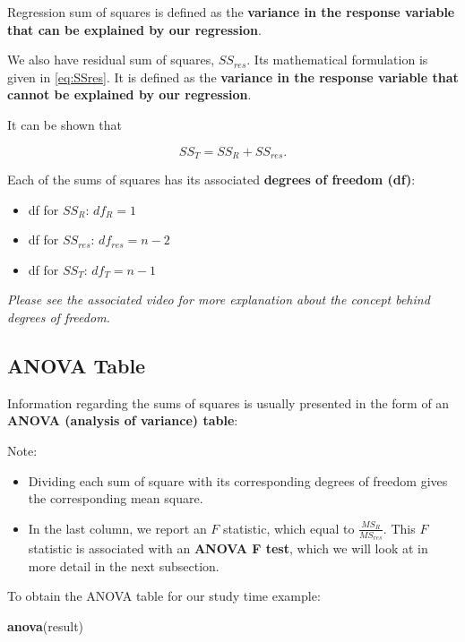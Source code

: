 \documentclass[
]{book}
\newenvironment{Shaded}{\begin{snugshade}}{\end{snugshade}}
\newcommand{\FunctionTok}[1]{\textcolor[rgb]{0.13,0.29,0.53}{\textbf{#1}}}
\newcommand{\NormalTok}[1]{#1}
\providecommand{\tightlist}{%
  \setlength{\itemsep}{0pt}\setlength{\parskip}{0pt}}
\begin{document}
Regression sum of squares is defined as the \textbf{variance in the response variable that can be explained by our regression}.

We also have residual sum of squares, \(SS_{res}\). Its mathematical formulation is given in \eqref{eq:SSres}. It is defined as the \textbf{variance in the response variable that cannot be explained by our regression}.

It can be shown that

\begin{equation}
SS_T = SS_R + SS_{res}.
\label{eq:SS}
\end{equation}

Each of the sums of squares has its associated \textbf{degrees of freedom (df)}:

\begin{itemize}
\tightlist
\item
  df for \(SS_R\): \(df_R = 1\)
\item
  df for \(SS_{res}\): \(df_{res} = n-2\)
\item
  df for \(SS_T\): \(df_T = n-1\)
\end{itemize}

\emph{Please see the associated video for more explanation about the concept behind degrees of freedom.}

\hypertarget{anova-table}{%
\subsection{ANOVA Table}\label{anova-table}}

Information regarding the sums of squares is usually presented in the form of an \textbf{ANOVA (analysis of variance) table}:

Note:

\begin{itemize}
\tightlist
\item
  Dividing each sum of square with its corresponding degrees of freedom gives the corresponding mean square.
\item
  In the last column, we report an \(F\) statistic, which equal to \(\frac{MS_R}{MS_{res}}\). This \(F\) statistic is associated with an \textbf{ANOVA F test}, which we will look at in more detail in the next subsection.
\end{itemize}

To obtain the ANOVA table for our study time example:

\begin{Shaded}
\begin{Highlighting}[]
\FunctionTok{anova}\NormalTok{(result)}
\end{Highlighting}
\end{Shaded}
\end{document}
